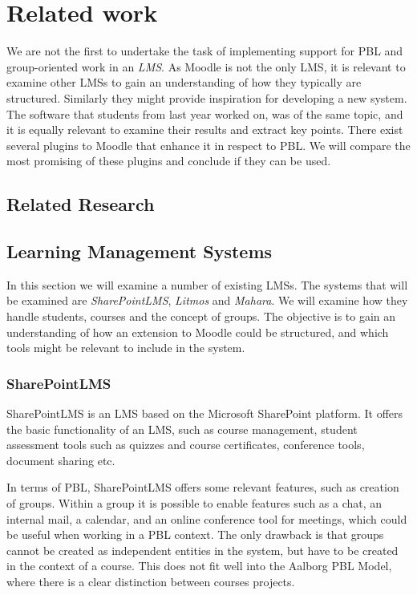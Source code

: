 \section{Related work}
We are not the first to undertake the task of implementing support for PBL and group-oriented work in an \textit{LMS}. 
As Moodle is not the only LMS, it is relevant to examine other LMSs to gain an understanding of how they typically are structured. 
Similarly they might provide inspiration for developing a new system.
The software that students from last year worked on, was of the same topic, and it is equally relevant to examine their results and extract key points.
There exist several plugins to Moodle that enhance it in respect to PBL. We will compare the most promising of these plugins and conclude if they can be used.

\subsection{Related Research}


\subsection{Learning Management Systems}
In this section we will examine a number of existing LMSs.
The systems that will be examined are \emph{SharePointLMS}, \emph{Litmos} and \emph{Mahara}.
We will examine how they handle students, courses and the concept of groups.
The objective is to gain an understanding of how an extension to Moodle could be structured, and which tools might be relevant to include in the system.

\subsubsection{SharePointLMS}
SharePointLMS \citep{sharepointlms} is an LMS based on the Microsoft SharePoint platform. 
It offers the basic functionality of an LMS, such as course management, student assessment tools such as quizzes and course certificates, conference tools, document sharing etc.

In terms of PBL, SharePointLMS offers some relevant features, such as creation of groups.
Within a group it is possible to enable features such as a chat, an internal mail, a calendar, and an online conference tool for meetings, which could be useful when working in a PBL context.
The only drawback is that groups cannot be created as independent entities in the system, but have to be created in the context of a course.
This does not fit well into the Aalborg PBL Model, where there is a clear distinction between courses projects.

